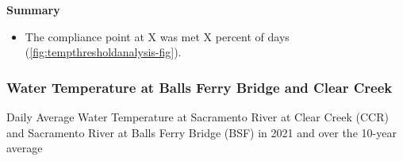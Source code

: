 \documentclass[
]{book}
\providecommand{\tightlist}{%
  \setlength{\itemsep}{0pt}\setlength{\parskip}{0pt}}
\theoremstyle{definition}
\theoremstyle{definition}
\theoremstyle{definition}
\theoremstyle{definition}
\theoremstyle{remark}
\begin{document}
\textbf{Summary}

\begin{itemize}
\tightlist
\item
  The compliance point at X was met X percent of days (\ref{fig:tempthresholdanalysis-fig}).
\end{itemize}

\hypertarget{water-temperature-at-balls-ferry-bridge-and-clear-creek}{%
\subsubsection{Water Temperature at Balls Ferry Bridge and Clear Creek}\label{water-temperature-at-balls-ferry-bridge-and-clear-creek}}

\label{fig:historicalwtemp-fig}Daily Average Water Temperature at Sacramento River at Clear Creek (CCR) and Sacramento River at Balls Ferry Bridge (BSF) in 2021 and over the 10-year average
\end{document}
